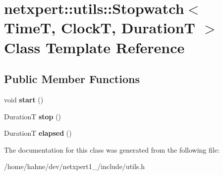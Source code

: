 \hypertarget{classnetxpert_1_1utils_1_1Stopwatch}{}\section{netxpert\+:\+:utils\+:\+:Stopwatch$<$ TimeT, ClockT, DurationT $>$ Class Template Reference}
\label{classnetxpert_1_1utils_1_1Stopwatch}
\subsection*{Public Member Functions}
\begin{DoxyCompactItemize}
\item 
void {\bfseries start} ()\hypertarget{classnetxpert_1_1utils_1_1Stopwatch_aae232eaac691cd36eac325fed4df9fe0}{}\label{classnetxpert_1_1utils_1_1Stopwatch_aae232eaac691cd36eac325fed4df9fe0}

\item 
DurationT {\bfseries stop} ()\hypertarget{classnetxpert_1_1utils_1_1Stopwatch_a3cd4be178b032591a5763b892777f126}{}\label{classnetxpert_1_1utils_1_1Stopwatch_a3cd4be178b032591a5763b892777f126}

\item 
DurationT {\bfseries elapsed} ()\hypertarget{classnetxpert_1_1utils_1_1Stopwatch_ae7b8d9c8d437571277decfe68e9a5aac}{}\label{classnetxpert_1_1utils_1_1Stopwatch_ae7b8d9c8d437571277decfe68e9a5aac}

\end{DoxyCompactItemize}


The documentation for this class was generated from the following file\+:\begin{DoxyCompactItemize}
\item 
/home/hahne/dev/netxpert1\+\_/include/utils.\+h\end{DoxyCompactItemize}
